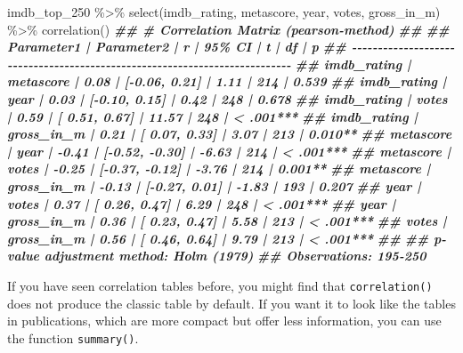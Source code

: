 \documentclass[
]{book}
\newenvironment{Shaded}{\begin{snugshade}}{\end{snugshade}}
\newcommand{\DocumentationTok}[1]{\textcolor[rgb]{0.56,0.35,0.01}{\textbf{\textit{#1}}}}
\newcommand{\FunctionTok}[1]{\textcolor[rgb]{0.00,0.00,0.00}{#1}}
\newcommand{\NormalTok}[1]{#1}
\newcommand{\SpecialCharTok}[1]{\textcolor[rgb]{0.00,0.00,0.00}{#1}}
\begin{document}
\begin{Shaded}
\begin{Highlighting}[]
\NormalTok{imdb\_top\_250 }\SpecialCharTok{\%\textgreater{}\%} 
  \FunctionTok{select}\NormalTok{(imdb\_rating, metascore, year, votes, gross\_in\_m) }\SpecialCharTok{\%\textgreater{}\%} 
  \FunctionTok{correlation}\NormalTok{()}
\DocumentationTok{\#\# \# Correlation Matrix (pearson{-}method)}
\DocumentationTok{\#\# }
\DocumentationTok{\#\# Parameter1  | Parameter2 |     r |         95\% CI |     t |  df |         p}
\DocumentationTok{\#\# {-}{-}{-}{-}{-}{-}{-}{-}{-}{-}{-}{-}{-}{-}{-}{-}{-}{-}{-}{-}{-}{-}{-}{-}{-}{-}{-}{-}{-}{-}{-}{-}{-}{-}{-}{-}{-}{-}{-}{-}{-}{-}{-}{-}{-}{-}{-}{-}{-}{-}{-}{-}{-}{-}{-}{-}{-}{-}{-}{-}{-}{-}{-}{-}{-}{-}{-}{-}{-}{-}{-}{-}{-}{-}{-}}
\DocumentationTok{\#\# imdb\_rating |  metascore |  0.08 | [{-}0.06,  0.21] |  1.11 | 214 | 0.539    }
\DocumentationTok{\#\# imdb\_rating |       year |  0.03 | [{-}0.10,  0.15] |  0.42 | 248 | 0.678    }
\DocumentationTok{\#\# imdb\_rating |      votes |  0.59 | [ 0.51,  0.67] | 11.57 | 248 | \textless{} .001***}
\DocumentationTok{\#\# imdb\_rating | gross\_in\_m |  0.21 | [ 0.07,  0.33] |  3.07 | 213 | 0.010**  }
\DocumentationTok{\#\# metascore   |       year | {-}0.41 | [{-}0.52, {-}0.30] | {-}6.63 | 214 | \textless{} .001***}
\DocumentationTok{\#\# metascore   |      votes | {-}0.25 | [{-}0.37, {-}0.12] | {-}3.76 | 214 | 0.001**  }
\DocumentationTok{\#\# metascore   | gross\_in\_m | {-}0.13 | [{-}0.27,  0.01] | {-}1.83 | 193 | 0.207    }
\DocumentationTok{\#\# year        |      votes |  0.37 | [ 0.26,  0.47] |  6.29 | 248 | \textless{} .001***}
\DocumentationTok{\#\# year        | gross\_in\_m |  0.36 | [ 0.23,  0.47] |  5.58 | 213 | \textless{} .001***}
\DocumentationTok{\#\# votes       | gross\_in\_m |  0.56 | [ 0.46,  0.64] |  9.79 | 213 | \textless{} .001***}
\DocumentationTok{\#\# }
\DocumentationTok{\#\# p{-}value adjustment method: Holm (1979)}
\DocumentationTok{\#\# Observations: 195{-}250}
\end{Highlighting}
\end{Shaded}

If you have seen correlation tables before, you might find that \texttt{correlation()} does not produce the classic table by default. If you want it to look like the tables in publications, which are more compact but offer less information, you can use the function \texttt{summary()}.
\end{document}
